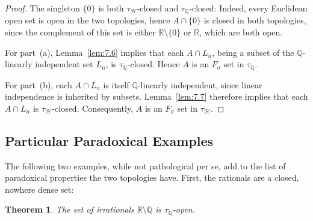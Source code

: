 \documentclass[11pt]{amsart} %
\newtheorem{theorem}{Theorem}[section]
\theoremstyle{definition}
\newcommand{\R}{\mathbb{R}}
\newcommand{\Q}{\mathbb{Q}}
\newcommand{\AD}{\mathcal{H}}
\begin{document}
\begin{proof}
The singleton $\{0\}$ is both $\tau_{\AD}$-closed and $\tau_{\Q}$-closed: Indeed, every Euclidean open set is open in the two topologies, hence $A\cap\{0\}$ is closed in both topologies, since the complement of this set is either $\R\setminus \{0\}$ or $\R$, which are both open. 


For part~(a), Lemma~\ref{lem:7.6} implies that each $A\cap L_n$, being a subset of the $\mathbb{Q}$-linearly independent set $L_n$, is $\tau_{\Q}$-closed. Hence $A$ is an $F_\sigma$ set in $\tau_{\Q}$.

For part~(b), each $A\cap L_n$ is itself $\mathbb{Q}$-linearly independent, since linear independence is inherited by subsets. Lemma~\ref{lem:7.7} therefore implies that each $A\cap L_n$ is $\tau_{\AD}$-closed. Consequently, $A$ is an $F_\sigma$ set in $\tau_{\AD}$.


\end{proof}

\subsection{Particular Paradoxical Examples}
The following two examples, while not pathological per se, add to the list of paradoxical properties the two topologies have. First, the rationals are a closed, nowhere dense set:

\begin{theorem}
\label{thm:7.8}
The set of irrationals $\mathbb{R}\setminus\mathbb{Q}$ is $\tau_{\Q}$-open.
\end{theorem}
\end{document}
